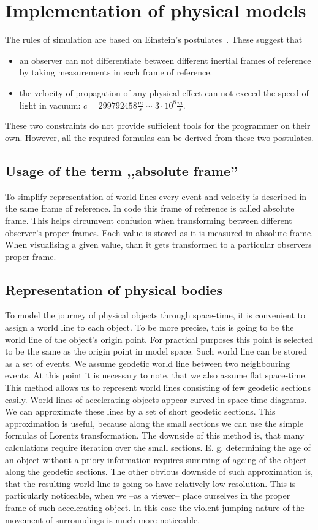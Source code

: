 \documentclass{egpubl}
\begin{document}
\section{Implementation of physical models}
The rules of simulation are based on Einstein's postulates~\cite{EinsteinElectrodynamics}. These suggest that
\begin{itemize}
\item an observer can not differentiate between different inertial frames of reference by taking measurements in each frame of reference.
\item the velocity of propagation of any physical effect can not exceed
the speed of light in vacuum: $c=299792458 \frac{m}{s} \sim 3 \cdot 10^8 \frac{m}{s}$.
 \end{itemize}
These two constraints do not provide sufficient tools for the programmer on their own. However, all the required formulas can be derived from these two postulates.

\subsection{Usage of the term ,,absolute frame''}
To simplify representation of world lines every event and velocity is described in the same frame of reference. In code this frame of reference is called absolute frame. This helps circumvent confusion when transforming between different observer's proper frames. Each value is stored as it is measured in absolute frame. When visualising a given value, than it gets transformed to a particular observers proper frame.

\subsection{Representation of physical bodies}
To model the journey of physical objects through space-time, it is convenient to assign a world line to each object. To be more precise, this is going to be the world line of the object's origin point. For practical purposes this point is selected to be the same as the origin point in model space. Such world line can be stored as a set of events. We assume geodetic world line between two neighbouring events. At this point it is necessary to note, that we also assume flat space-time. This method allows us to represent world lines consisting of few geodetic sections easily. World lines of accelerating objects appear curved in space-time diagrams. We can approximate these lines by a set of short geodetic sections. This approximation is useful, because along the small sections we can use the simple formulas of Lorentz transformation. The downside of this method is, that many calculations require iteration over the small sections. E. g. determining the age of an object without a priory information requires summing of ageing of the object along the geodetic sections. The other obvious downside of such approximation is, that the resulting world line is going to have relatively low resolution. This is particularly noticeable, when we --as a viewer-- place ourselves in the proper frame of such accelerating object. In this case the violent jumping nature of the movement of surroundings is much more noticeable.
\end{document}
